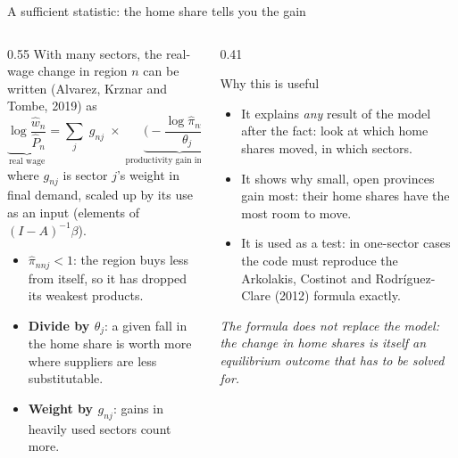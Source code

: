 \documentclass[aspectratio=169,9pt,t]{beamer}
\newcommand{\h}[1]{\hat{#1}}
\newcommand{\plain}[1]{{\color{ipgrey}\small\itshape #1}}
\begin{document}
\begin{frame}{A sufficient statistic: the home share tells you the gain}
  \begin{columns}[T]
    \begin{column}{0.55\textwidth}
      With many sectors, the real-wage change in region $n$ can be written
      (Alvarez, Krznar and Tombe, 2019) as
      \[ \underbrace{\log\frac{\h w_n}{\h P_n}}_{\text{real wage}}
         =\sum_j\; g_{nj}\;\times\;\underbrace{\Big(-\frac{\log\h\pi_{nnj}}{\theta_j}\Big)}_{\text{productivity gain in sector } j} \]
      where $g_{nj}$ is sector $j$'s weight in final demand, scaled up by
      its use as an input (elements of $(I-A)^{-1}\beta$).

      \medskip
      \begin{itemize}
        \item \textbf{$\h\pi_{nnj}<1$}: the region buys less from itself,
              so it has dropped its weakest products.
        \item \textbf{Divide by $\theta_j$}: a given fall in the home share
              is worth more where suppliers are less substitutable.
        \item \textbf{Weight by $g_{nj}$}: gains in heavily used sectors
              count more.
      \end{itemize}
    \end{column}
    \begin{column}{0.41\textwidth}
      \begin{block}{Why this is useful}
        \small
        \begin{itemize}
          \item It explains \emph{any} result of the model after the
                fact: look at which home shares moved, in which sectors.
          \item It shows why small, open provinces gain most: their home
                shares have the most room to move.
          \item It is used as a test: in one-sector cases the code must
                reproduce the Arkolakis, Costinot and Rodr\'iguez-Clare
                (2012) formula exactly.
        \end{itemize}
      \end{block}
      \plain{The formula does not replace the model: the change in home
      shares is itself an equilibrium outcome that has to be solved for.}
    \end{column}
  \end{columns}
\end{frame}
\end{document}
